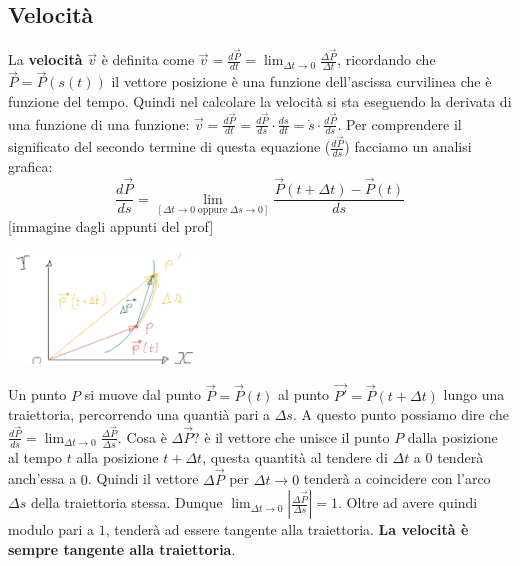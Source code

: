 \subsection{Velocità}
La \textbf{velocità} $\vec{v}$ è definita come $\vec{v} = \frac{d \vec{P}}{dt} = \lim_{\Delta t\rightarrow 0} \frac{\Delta \vec{P}}{\Delta t}$, ricordando che $\vec{P} = \vec{P}(s(t))$ il vettore posizione è una funzione dell'ascissa curvilinea che è funzione del tempo.\newline
Quindi nel calcolare la velocità si sta eseguendo la derivata di una funzione di una funzione: $\vec{v} = \frac{d \vec{P}}{dt} = \frac{d \vec{P}}{ds} \cdot \frac{ds}{dt} = \dot{s} \cdot  \frac{d \vec{P}}{ds}$.\newline
\newline
Per comprendere il significato del secondo termine di questa equazione ($\frac{d \vec{P}}{ds}$) facciamo un analisi grafica:
\[
    \frac{d \vec{P}}{ds} = \lim_{[\Delta t\rightarrow 0 \;\text{oppure}\; \Delta s \rightarrow 0]}\frac{\vec{P}(t+\Delta t) - \vec{P}(t)}{ds} 
\]
[immagine dagli appunti del prof]\newline
\begin{center}
    \includegraphics[height=3cm]{../lezione1/img2.JPG}
\end{center}
Un punto $P$ si muove dal punto $\vec{P} = \vec{P}(t)$ al punto $\vec{P'} = \vec{P} (t + \Delta t)$ lungo una traiettoria, percorrendo una quantià pari a $\Delta s$. A questo punto possiamo dire che $\frac{d\vec{P}}{ds} = \lim_{\Delta t\rightarrow 0} \frac{\Delta \vec{P}}{\Delta s}$.\newline
Cosa è $\Delta \vec{P}$? è il vettore che unisce il punto $P$ dalla posizione al tempo $t$ alla posizione $t + \Delta t$, questa quantità al tendere di $\Delta t$ a $0$ tenderà anch'essa a $0$. Quindi il vettore $\Delta \vec{P}$ per $\Delta t \rightarrow 0$ tenderà a coincidere con l'arco $\Delta s$ della traiettoria stessa.\newline
\newline
Dunque $\lim_{\Delta t\rightarrow 0} \left|\frac{\Delta \vec{P}}{\Delta s}\right| = 1$. Oltre ad avere quindi modulo pari a $1$, tenderà ad essere tangente alla traiettoria. \textbf{La velocità è sempre tangente alla traiettoria}.\newline
